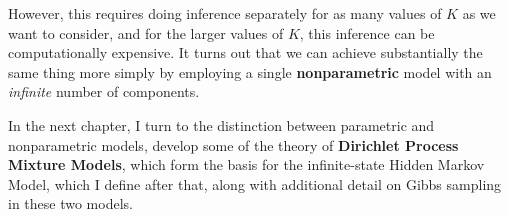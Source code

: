However, this requires doing inference separately for as many values
of $K$ as we want to consider, and for the larger values of $K$, this
inference can be computationally expensive.  It turns out that we can
achieve substantially the same thing more simply by employing a single
{\bf nonparametric} model with an {\em infinite} number of
components.  

In the next chapter, I turn to the distinction between parametric and
nonparametric models, develop some of the theory of {\bf Dirichlet Process Mixture
  Models}, which form the basis for the infinite-state Hidden Markov
Model, which I define after that, along with additional detail on
Gibbs sampling in these two models.

